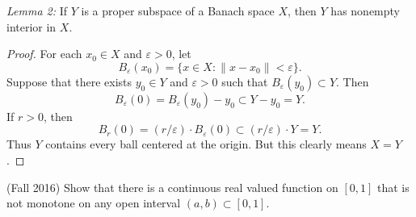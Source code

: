 \documentclass[answers]{exam}
\theoremstyle{problemstyle}
\newcommand{\norm}[1]{\left\lVert#1\right\rVert} %
\newcommand{\1}[1]{\textbf{1}_{\left[#1\right]}} %
\def\Q{\mathbb{Q}} %
\begin{document}
\begin{questions}
\begin{solution}
  \noindent \textit{Lemma 2:} If $Y$ is a proper subspace of a Banach space $X$, then $Y$ has nonempty interior in $X$.
  \begin{proof}
  	For each $x_0 \in X$ and $\varepsilon > 0$, let
  	\[ B_\varepsilon(x_0) = \{ x \in X: \| x - x_0 \| < \varepsilon \}. \]
  	Suppose that there exists $y_0 \in Y$ and $\varepsilon > 0$ such that $B_\varepsilon(y_0) \subset Y$. Then
  	\[ B_\varepsilon(0) = B_\varepsilon(y_0) - y_0 \subset Y - y_0 = Y. \]
  	If $r > 0$, then
  	\[ B_r(0) = (r / \varepsilon) \cdot B_\varepsilon(0) \subset (r / \varepsilon) \cdot Y = Y. \]
  	Thus $Y$ contains every ball centered at the origin. But this clearly means $X = Y$.
  \end{proof}
\end{solution}

\item (Fall 2016) Show that there is a continuous real valued function on $[0,1]$ that is not monotone on any open interval $(a,b)\subset [0,1]$.

  


\end{questions}
\end{document}
